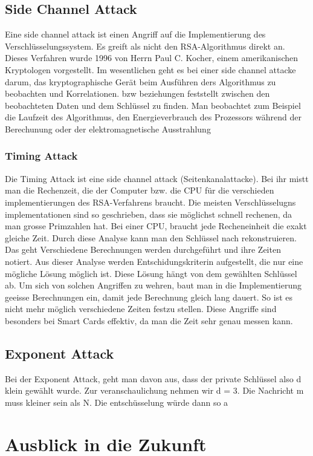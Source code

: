 %
\subsection{Side Channel Attack}
Eine side channel attack ist einen Angriff auf die Implementierung des Verschlüsselungssystem. Es greift als nicht den RSA-Algorithmus direkt an.
Dieses Verfahren wurde 1996 von Herrn Paul C. Kocher, einem amerikanischen Kryptologen vorgestellt.
Im wesentlichen geht es bei einer side channel attacke darum, das kryptographische Gerät beim Ausführen ders Algorithmus zu beobachten und Korrelationen. bzw beziehungen feststellt zwischen den beobachteten Daten und dem Schlüssel zu finden.
Man beobachtet zum Beispiel die Laufzeit des Algorithmus, den Energieverbrauch des Prozessors während der Berechunung oder der elektromagnetische Ausstrahlung
%
\subsubsection{Timing Attack}
Die Timing Attack ist eine side channel attack (Seitenkanalattacke). 
Bei ihr mistt man die Rechenzeit, die der Computer bzw. die CPU für die verschieden implementierungen des RSA-Verfahrens braucht. Die meisten Verschlüsselugns implementationen sind so geschrieben, dass sie möglichst schnell rechenen, da man grosse Primzahlen hat. Bei einer CPU, braucht jede Recheneinheit die exakt gleiche Zeit. Durch diese Analyse kann man den Schlüssel nach rekonstruieren. Das geht 
%
Verschiedene Berechnungen werden durchgeführt und ihre Zeiten notiert. Aus dieser Analyse werden Entschidungskriterin aufgestellt, die nur eine mögliche Lösung möglich ist. Diese Lösung hängt von dem gewählten Schlüssel ab.
%
Um sich von solchen Angriffen zu wehren, baut man in die Implementierung geeisse Berechnungen ein, damit jede Berechnung gleich lang dauert. So ist es nicht mehr möglich verschiedene Zeiten festzu stellen.
%
Diese Angriffe sind besonders bei Smart Cards effektiv, da man die Zeit sehr genau messen kann.
%
\subsection{Exponent Attack}
Bei der Exponent Attack, geht man davon aus, dass der private Schlüssel also d klein gewählt wurde. Zur veranschaulichung nehmen wir d = 3.
Die Nachricht m muss kleiner sein als N. Die entschüsselung würde dann so a
\section{Ausblick in die Zukunft}
